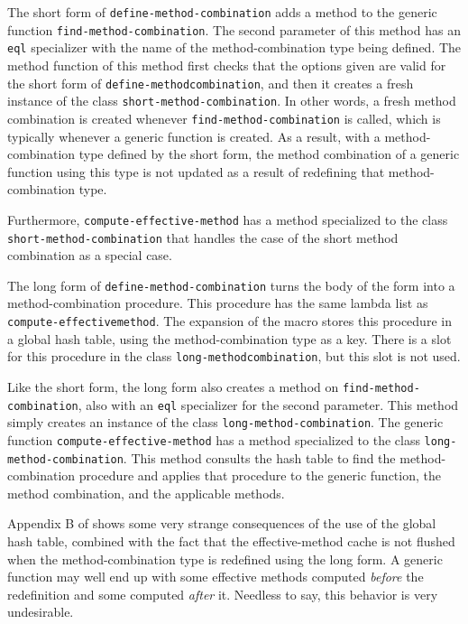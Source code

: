 The short form of \texttt{define-method-combination} adds a method to
the generic function \texttt{find-method-combination}.  The second
parameter of this method has an \texttt{eql} specializer with the name
of the method-combination type being defined.  The method function of
this method first checks that the options given are valid for the
short form of \texttt{define-method\-combination}, and then it creates
a fresh instance of the class \texttt{short-method-combination}.  In
other words, a fresh method combination is created whenever
\texttt{find-method-combination} is called, which is typically
whenever a generic function is created.  As a result, with a
method-combination type defined by the short form, the method
combination of a generic function using this type is not updated as a
result of redefining that method-combination type.

Furthermore, \texttt{compute-effective-method} has a method
specialized to the class \texttt{short-method-combination} that
handles the case of the short method combination as a special case.

The long form of \texttt{define-method-combination} turns the body of
the form into a method-combination procedure.  This procedure has the
same lambda list as \texttt{compute-effective\-method}.  The expansion
of the macro stores this procedure in a global hash table, using the
method-combination type as a key.  There is a slot for this procedure
in the class \texttt{long-method\-combination}, but this slot is not
used.

Like the short form, the long form also creates a method on
\texttt{find-method-combination}, also with an \texttt{eql}
specializer for the second parameter. This method simply creates an
instance of the class \texttt{long-method-combination}.  The generic
function \texttt{compute-effective-method} has a method specialized to
the class \texttt{long-method-combination}.  This method consults the
hash table to find the method-combination procedure and applies that
procedure to the generic function, the method combination, and the
applicable methods.

Appendix B of \cite{verna.18.els} shows some very strange consequences
of the use of the global hash table, combined with the fact that the
effective-method cache is not flushed when the method-combination type
is redefined using the long form.  A generic function may well end up
with some effective methods computed \emph{before} the redefinition
and some  computed \emph{after} it.  Needless to say, this behavior is
very undesirable.


